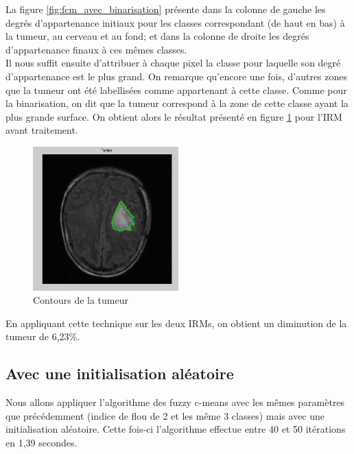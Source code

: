 		La figure \ref{fig:fcm_avec_binarisation} présente dans la colonne de gauche les degrés d'appartenance initiaux pour les classes correspondant (de haut en bas) à la tumeur, au cerveau et au fond; et dans la colonne de droite les degrés d'appartenance finaux à ces mêmes classes.\\

		Il nous suffit ensuite d'attribuer à chaque pixel la classe pour laquelle son degré d'appartenance est le plus grand. On remarque qu'encore une fois, d'autres zones que la tumeur ont été labellisées comme appartenant à cette classe. Comme pour la binarisation, on dit que la tumeur correspond à la zone de cette classe ayant la plus grande surface. On obtient alors le résultat présenté en figure \ref{fig:fcm_tumeur} pour l'IRM avant traitement.

		\begin{figure}[H]
			\centering
			\includegraphics[width=0.5\textwidth]{images/2-tumeur.png}
			\caption{Contours de la tumeur}
			\label{fig:fcm_tumeur}
		\end{figure}

		En appliquant cette technique sur les deux IRMs, on obtient un diminution de la tumeur de 6,23\%.

	\subsection{Avec une initialisation aléatoire} %
	\label{ssub:avec_une_initialisation_al_atoire}
		Nous allons appliquer l'algorithme des fuzzy c-means avec les mêmes paramètres que précédemment (indice de flou de 2 et les même 3 classes) mais avec une initialisation aléatoire. Cette fois-ci l'algorithme effectue entre 40 et 50 itérations en 1,39 secondes. \\

